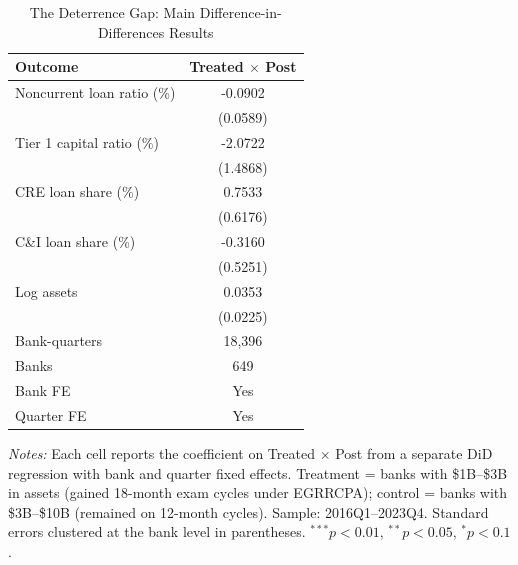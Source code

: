 \begin{table}[t]
\centering
\caption{The Deterrence Gap: Main Difference-in-Differences Results}
\label{tab:main}
\small
\begin{threeparttable}
\begin{tabular}{lc}
\toprule
Outcome & Treated $\times$ Post \\
\midrule
Noncurrent loan ratio (\%) & -0.0902 \\
& (0.0589) \\
\addlinespace
Tier 1 capital ratio (\%) & -2.0722 \\
& (1.4868) \\
\addlinespace
CRE loan share (\%) & 0.7533 \\
& (0.6176) \\
\addlinespace
C\&I loan share (\%) & -0.3160 \\
& (0.5251) \\
\addlinespace
Log assets & 0.0353 \\
& (0.0225) \\
\midrule
Bank-quarters & 18,396 \\
Banks & 649 \\
Bank FE & Yes \\
Quarter FE & Yes \\
\bottomrule
\end{tabular}
\begin{tablenotes}
\item \textit{Notes:} Each cell reports the coefficient on Treated $\times$ Post from a separate DiD regression with bank and quarter fixed effects. Treatment = banks with \$1B--\$3B in assets (gained 18-month exam cycles under EGRRCPA); control = banks with \$3B--\$10B (remained on 12-month cycles). Sample: 2016Q1--2023Q4. Standard errors clustered at the bank level in parentheses. $^{***}p<0.01$, $^{**}p<0.05$, $^{*}p<0.1$.
\end{tablenotes}
\end{threeparttable}
\end{table}
